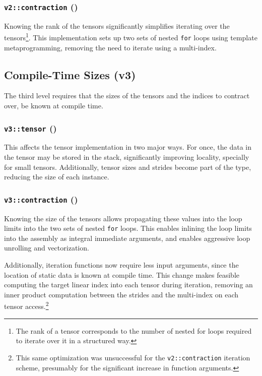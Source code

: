 \documentclass[conference]{IEEEtran}
\begin{document}
\subsubsection{\texttt{v2::contraction} ()}

Knowing the rank of the tensors significantly simplifies iterating over the
tensors\footnote{The rank of a tensor corresponds to the number of nested for
loops required to iterate over it in a structured way.}.
This implementation sets up two sets of nested \texttt{for} loops using template
metaprogramming, removing the need to iterate using a multi-index.

\subsection{Compile-Time Sizes (v3)}

The third level requires that the sizes of the tensors and the indices to
contract over, be known at compile time.

\subsubsection{\texttt{v3::tensor} ()}

This affects the tensor implementation in two major ways.
For once, the data in the tensor may be stored in the stack, significantly
improving locality, specially for small tensors.
Additionally, tensor sizes and strides become part of the type, reducing the
size of each instance.

\subsubsection{\texttt{v3::contraction} ()}

Knowing the size of the tensors allows propagating these values into the loop
limits into the two sets of nested \texttt{for} loops.
This enables inlining the loop limits into the assembly as integral immediate
arguments, and enables aggressive loop unrolling and vectorization.

Additionally, iteration functions now require less input arguments, since the
location of static data is known at compile time.
This change makes feasible computing the target linear index into each tensor
during iteration, removing an inner product computation between the strides and
the multi-index on each tensor access.\footnote{This same optimization was
unsuccessful for the \texttt{v2::contraction} iteration scheme, presumably for
the significant increase in function arguments.}
\end{document}
